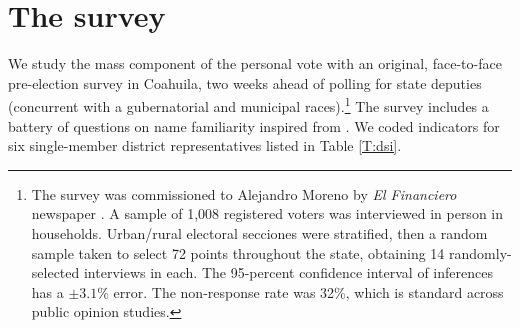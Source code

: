 \documentclass[letter,12pt]{article}
\newcommand{\mc}{\multicolumn}
\begin{document}

\section{The survey}

We study the mass component of the personal vote with an original, face-to-face pre-election survey in Coahuila, two weeks ahead of polling for state deputies (concurrent with a gubernatorial and municipal races).\footnote{The survey was commissioned to Alejandro Moreno by \emph{El Financiero} newspaper \citep[interviews were conducted from between May 19--21, 2017, published May 25, ][]{moreno-coah.2017}. A sample of 1,008 registered voters was interviewed in person in households. Urban/rural electoral secciones were stratified, then a random sample taken to select 72 points throughout the state, obtaining 14 randomly-selected interviews  in each. The 95-percent confidence interval of inferences has a $\pm3.1\%$ error. The non-response rate was 32\%, which is standard across public opinion studies.} The survey includes a battery of questions on name familiarity inspired from \citet{cain.etal.1987}. We coded indicators for six single-member district representatives listed in Table \ref{T:dsi}.  

\end{document}
